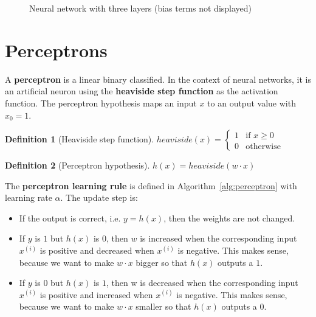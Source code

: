 \documentclass{report}
\newtheorem{definition}{Definition}[section]
\begin{document}
\begin{figure}[h!]
\centering
{}
\caption{Neural network with three layers (bias terms not displayed)}
\label{ref:neuralnetwork}
\end{figure}

\section{Perceptrons}
A {\bf perceptron} is a linear binary classified. In the context of neural networks, it is an artificial neuron using the {\bf heaviside step function} as the activation function.
The perceptron hypothesis maps an input $x$ to an output value with $x_0=1$.

\begin{definition}[Heaviside step function]
$heaviside(x) = \left\{
\begin{array}{lll}
1  & \mbox{if } x \ge 0 \\
0  & \mbox{otherwise}
\end{array}
\right.$
\end{definition}

\begin{definition}[Perceptron hypothesis]
$h(x) = heaviside(w\cdot x)$
\end{definition}


The {\bf perceptron learning rule} is defined in Algorithm~\ref{alg:perceptron} with learning rate $\alpha$. The update step is:
\begin{itemize}
\item If the output is correct, i.e. $y = h(x)$, then the weights are not changed.
\item If $y$ is $1$ but $h(x)$ is $0$, then $w$ is increased when the corresponding input $x^{(i)}$ is positive and decreased when $x^{(i)}$ is negative. This makes sense, because we want to make $w\cdot x$ bigger so that $h(x)$ outputs a $1$.
\item If $y$ is 0 but $h(x)$ is $1$, then w is decreased when the corresponding input $x^{(i)}$ is positive and increased when $x^{(i)}$ is negative. This makes sense, because we want to make $w\cdot x$ smaller so that $h(x)$ outputs a $0$.
\end{itemize}
\end{document}
